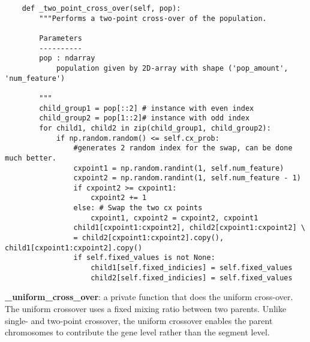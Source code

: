 \documentclass[12pt]{article}
\begin{document}
\begin{verbatim}
	def _two_point_cross_over(self, pop):
		"""Performs a two-point cross-over of the population.
	
	    Parameters
	    ----------
		pop : ndarray
			population given by 2D-array with shape ('pop_amount', 'num_feature')

		"""
		child_group1 = pop[::2] # instance with even index
		child_group2 = pop[1::2]# instance with odd index
		for child1, child2 in zip(child_group1, child_group2):
			if np.random.random() <= self.cx_prob:
				#generates 2 random index for the swap, can be done much better.
				cxpoint1 = np.random.randint(1, self.num_feature)
				cxpoint2 = np.random.randint(1, self.num_feature - 1)
				if cxpoint2 >= cxpoint1:
					cxpoint2 += 1
				else: # Swap the two cx points
					cxpoint1, cxpoint2 = cxpoint2, cxpoint1
				child1[cxpoint1:cxpoint2], child2[cxpoint1:cxpoint2] \
				= child2[cxpoint1:cxpoint2].copy(), child1[cxpoint1:cxpoint2].copy()
				if self.fixed_values is not None:
					child1[self.fixed_indicies] = self.fixed_values
					child2[self.fixed_indicies] = self.fixed_values
\end{verbatim}
\textbf{\_uniform\_cross\_over}: a private function that does the uniform cross-over. The uniform crossover uses a fixed mixing ratio between two parents. Unlike single- and two-point crossover, the uniform crossover enables the parent chromosomes to contribute the gene level rather than the segment level.
\end{document}
